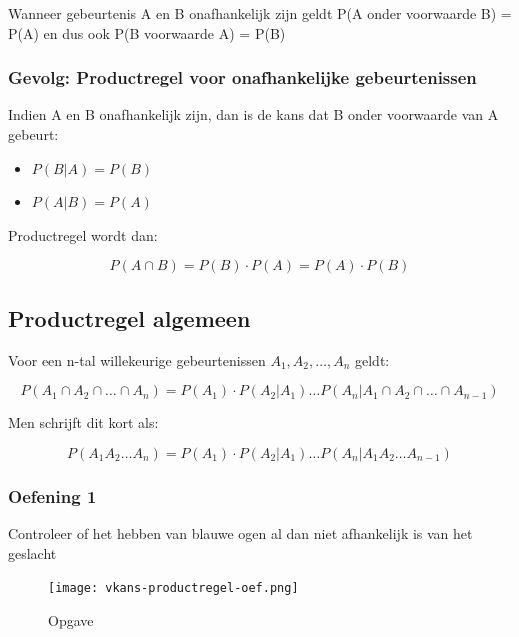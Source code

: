 \documentclass{article}
\begin{document}
Wanneer gebeurtenis A en B onafhankelijk zijn geldt P(A onder voorwaarde B) = P(A) en dus ook P(B voorwaarde A) = P(B)

\subsubsection{Gevolg: Productregel voor onafhankelijke gebeurtenissen}

Indien A en B onafhankelijk zijn, dan is de kans dat B onder voorwaarde van A gebeurt:

\begin{itemize}
    \item $P(B | A) = P(B)$
    \item $P(A | B) = P(A)$
\end{itemize}

Productregel wordt dan: 

\begin{equation}
    P(A \cap B) = P(B) \cdot P(A) = P(A) \cdot P(B)
\end{equation}

\subsection{Productregel algemeen}

Voor een n-tal willekeurige gebeurtenissen $A_1, A_2, \dots, A_n$ geldt:

\begin{equation}
    P(A_1 \cap A_2 \cap \dots \cap A_n) = P(A_1) \cdot P(A_2 | A_1) \dots P(A_n | A_1 \cap A_2 \cap \dots \cap A_{n-1})
\end{equation}

Men schrijft dit kort als:

\begin{equation}
    P(A_1 A_2 \dots A_n) = P(A_1) \cdot P(A_2 | A_1) \dots P(A_n | A_1 A_2 \dots A_{n-1})
\end{equation}

\subsubsection{Oefening 1}

Controleer of het hebben van blauwe ogen al dan niet afhankelijk is van het geslacht

\begin{figure}[H]
    \centering
    \texttt{[image: vkans-productregel-oef.png]}
    \caption{Opgave}
\end{figure}
\end{document}
